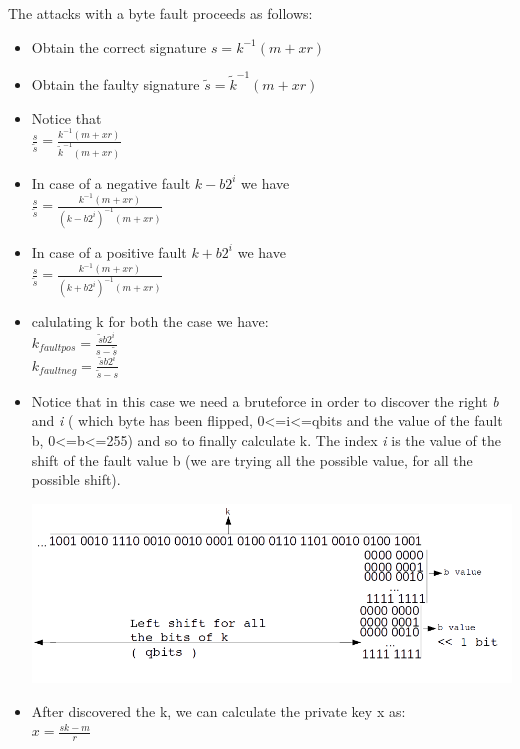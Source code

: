 \documentclass[11pt,english]{article}
\begin{document}
The attacks with a byte fault proceeds as follows: 
\begin{itemize}
\item Obtain the correct signature $s = k^{-1}(m + xr) $
\item Obtain the faulty signature $\tilde{s} = \tilde{k}^{-1}(m + xr)$
\item Notice that \\$\frac{s}{\tilde{s}}  = \frac{k^{-1}(m+xr)}{\tilde{k}^{-1}(m+xr)}$

\item In case of a negative fault $k-b2^{i} $ we have\\ $\frac{s}{\tilde{s}} = \frac{k^{-1}(m+xr)}{(k-b2^{i})^{-1}(m+xr)}$

\item In case of a positive fault $k+b2^{i} $ we have \\$\frac{s}{\tilde{s}} = \frac{k^{-1}(m+xr)}{(k+b2^{i})^{-1}(m+xr)}$


\item calulating k for both the case we have: \\$k_{faultpos} = \frac{\tilde{s}b2^{i}}{s-\tilde{s}}$ \\
$k_{faultneg} = \frac{\tilde{s}b2^{i}}{\tilde{s}-s}$ \\

\item Notice that in this case we need a bruteforce in order to discover the right \textit{b} and \textit{i} ( which byte has been flipped, 0<=i<=qbits and the value of the fault b, 0<=b<=255) and so to finally calculate k. The index \textit{i} is the value of the shift of the fault value b (we are trying all the possible value, for all the possible shift).

\includegraphics[width=1.0\textwidth]{img/img_4.png} \\

\item After discovered the k, we can calculate the private key x as:\\ $x = \frac{sk - m}{r}$


\end{itemize}
\end{document}
